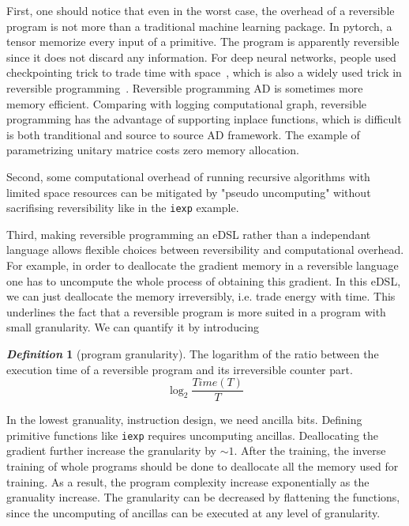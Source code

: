 \documentclass[aps,twocolumn,longbibliography,english,superscriptaddress,prr]{revtex4-1}
\newcommand{\<}{\langle}
\renewcommand{\>}{\rangle}
\theoremstyle{definition}\newtheorem{definition}{\textit{Definition}}
\begin{document}
First, one should notice that even in the worst case, the overhead of a reversible program is not more than a traditional machine learning package. In pytorch, a tensor memorize every input of a primitive. The program is apparently reversible since it does not discard any information.
For deep neural networks, people used checkpointing trick to trade time with space~\cite{Chen2016}, which is also a widely used trick in reversible programming~\cite{Perumalla2013}. Reversible programming AD is sometimes more memory efficient. Comparing with logging computational graph, reversible programming has the advantage of supporting inplace functions, which is difficult is both tranditional and source to source AD framework. The example of parametrizing unitary matrice costs zero memory allocation.

Second, some computational overhead of running recursive algorithms with limited space resources can be mitigated by "pseudo uncomputing" without sacrifising reversibility like in the \texttt{iexp} example.

Third, making reversible programming an eDSL rather than a independant language allows flexible choices between reversibility and computational overhead. For example, in order to deallocate the gradient memory in a reversible language one has to uncompute the whole process of obtaining this gradient.
In this eDSL, we can just deallocate the memory irreversibly, i.e. trade energy with time. This underlines the fact that a reversible program is more suited in a program with small granularity. We can quantify it by introducing
\begin{definition}[program granularity]
    The logarithm of the ratio between the execution time of a reversible program and its irreversible counter part.
    \begin{equation}
        \log_2 \frac{Time(T)}{T}
    \end{equation}
\end{definition}

In the lowest granuality, instruction design, we need ancilla bits. Defining primitive functions like \texttt{iexp} requires uncomputing ancillas. Deallocating the gradient further increase the granularity by $\sim 1$. After the training, the inverse training of whole programs should be done to deallocate all the memory used for training. As a result, the program complexity increase exponentially as the granuality increase.
The granularity can be decreased by flattening the functions, since the uncomputing of ancillas can be executed at any level of granularity.
\end{document}
